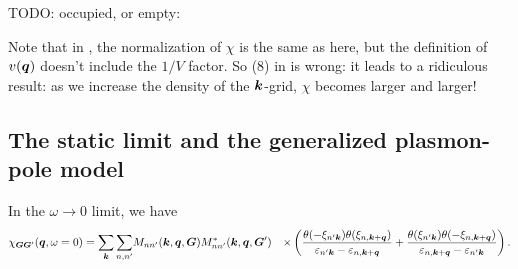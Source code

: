 \documentclass[hyperref, a4paper, 12pt]{report}
\def\\{}%
\begin{document}
TODO: occupied, or empty: 

Note that in \cite{berkeleygw},
the normalization of $\chi$ is the same as here,
but the definition of $v(\vb*{q})$ doesn't include the $1/V$ factor.
So (8) in \cite{berkeleygw} is wrong:
it leads to a ridiculous result: 
as we increase the density of the $\vb*{k}$-grid,
$\chi$ becomes larger and larger!

\subsection{The static limit and the generalized plasmon-pole model}\label{sec:gw-bse.epsilon.gpp}

In the $\omega \to 0$ limit, 
we have 
\begin{equation}
    \begin{aligned}
        \chi_{\vb*{G} \vb*{G}'}(\vb*{q}, \omega = 0) = \sum_{\vb*{k}} \sum_{n, n'} 
        &M_{n n'} (\vb*{k}, \vb*{q}, \vb*{G}) M^*_{nn'} (\vb*{k}, \vb*{q}, \vb*{G}') \\
        &\times \left(
            \frac{
                \theta(- \xi_{n' \vb*{k}}) \theta(\xi_{n, \vb*{k} + \vb*{q}})
            }{
                \varepsilon_{n' \vb*{k}} - \varepsilon_{n, \vb*{k} + \vb*{q}} 
            }
            + \frac{
                \theta(\xi_{n' \vb*{k}}) \theta(- \xi_{n, \vb*{k} + \vb*{q}})
            }{
                \varepsilon_{n, \vb*{k} + \vb*{q}} - \varepsilon_{n' \vb*{k}}
            }
        \right).
    \end{aligned}
    \label{eq:static-epsilon}
\end{equation}
\end{document}
